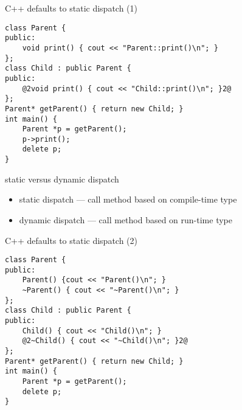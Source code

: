 \begin{frame}[fragile,label=staticDispatchPrint]{C++ defaults to static dispatch (1)}
\begin{lstlisting}
class Parent {
public:
    void print() { cout << "Parent::print()\n"; }
};
class Child : public Parent {
public:
    @2void print() { cout << "Child::print()\n"; }2@
};
Parent* getParent() { return new Child; }
int main() {
    Parent *p = getParent();
    p->print();
    delete p;
}
\end{lstlisting}
\end{frame}

\begin{frame}{static versus dynamic dispatch}
    \begin{itemize}
        \item static dispatch --- call method based on compile-time type
        \item dynamic dispatch --- call method based on run-time type
    \end{itemize}
\end{frame}

\begin{frame}[fragile,label=staticDispatchDestroy]{C++ defaults to static dispatch (2)}
\begin{lstlisting}
class Parent {
public:
    Parent() {cout << "Parent()\n"; }
    ~Parent() { cout << "~Parent()\n"; }
};
class Child : public Parent {
public:
    Child() { cout << "Child()\n"; }
    @2~Child() { cout << "~Child()\n"; }2@
};
Parent* getParent() { return new Child; }
int main() {
    Parent *p = getParent();
    delete p;
}
\end{lstlisting}
\end{frame}

